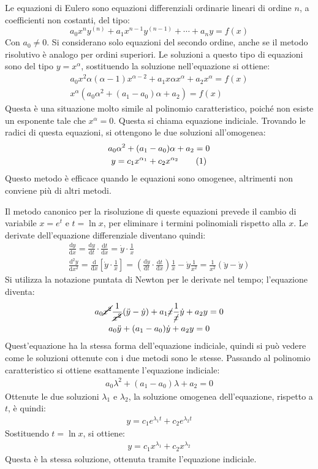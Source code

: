 \documentclass{article}
\newcommand{\df}{\mathrm{d}}
\newcommand{\diff}[2]{\displaystyle\frac{\df{#1}}{\df{#2}}}
\newcommand{\diffn}[3]{\displaystyle\frac{\df^{#3}{#1}}{\df{#2}^{#3}}}
\numberwithin{equation}{subsection}
\newcommand{\tageq}{\tag{\stepcounter{equation}\theequation}}
\begin{document}
Le equazioni di Eulero sono equazioni differenziali ordinarie lineari di ordine $n$, a coefficienti non costanti, del tipo:
\begin{equation}
    a_0x^ny^{(n)}+a_1x^{n-1}y^{(n-1)}+\cdots+a_ny=f(x)
\end{equation}
Con $a_0\neq0$. Si considerano solo equazioni del secondo ordine, anche se il metodo risolutivo è analogo per ordini superiori. Le soluzioni a questo tipo di equazioni sono del tipo $y=x^\alpha$, sostituendo la soluzione nell'equazione si ottiene:
\begin{gather*}
    a_0x^2\alpha(\alpha-1)x^{\alpha-2}+a_1x\alpha x^{\alpha}+a_2x^{\alpha}=f(x)\\
    x^\alpha(a_0\alpha^2+(a_1-a_0)\alpha+a_2)=f(x)
\end{gather*}
Questa è una situazione molto simile al polinomio caratteristico, poiché non esiste un esponente tale che $x^\alpha=0$. Questa si chiama equazione indiciale. Trovando le radici di questa equazioni, si ottengono le due soluzioni all'omogenea:
\begin{gather*}
    a_0\alpha^2+(a_1-a_0)\alpha+a_2=0\\
    y=c_1x^{\alpha_1}+c_2x^{\alpha_2}\tageq
\end{gather*}
Questo metodo è efficace quando le equazioni sono omogenee, altrimenti non conviene più di altri metodi. 


Il metodo canonico per la risoluzione di queste equazioni prevede il cambio di variabile $x=e^t$ e $t=\ln x$, per eliminare i termini polinomiali rispetto alla $x$. Le derivate dell'equazione differenziale diventano quindi:
\begin{gather*}
    \diff{y}{x}=\diff{y}{t}\cdot\diff{t}{x}=\dot y\cdot\frac{1}{x}\\
    \diffn{y}{x}{2}=\frac{\df}{\df x}\left[\dot y\cdot\frac{1}{x}\right]=\left(\diff{\dot y}{t}\cdot\diff{t}{x}\right)\frac{1}{x}-\dot y\frac{1}{x^2}=\frac{1}{x^2}(\ddot y-\dot y)
\end{gather*}
Si utilizza la notazione puntata di Newton per le derivate nel tempo; l'equazione diventa:
\begin{gather*}
    a_0\cancel{x^2}\frac{1}{\cancel{x^2}}(\ddot y-\dot y)+a_1\cancel{x}\frac{1}{\cancel{x}}\dot y+a_2y=0\\
    a_0\ddot y+(a_1-a_0)\dot y+a_2y=0
\end{gather*}
Quest'equazione ha la stessa forma dell'equazione indiciale, quindi si può vedere come le soluzioni ottenute con i due metodi sono le stesse. Passando al polinomio caratteristico si ottiene esattamente l'equazione indiciale:
\begin{gather*}
    a_0\lambda^2+(a_1-a_0)\lambda+a_2=0
\end{gather*}
Ottenute le due soluzioni $\lambda_1$ e $\lambda_2$, la soluzione omogenea dell'equazione, rispetto a $t$, è quindi:
\begin{gather*}
    y=c_1e^{\lambda_1t}+c_2e^{\lambda_2t}
\end{gather*}
Sostituendo $t=\ln x$, si ottiene:
\begin{gather}
    y=c_1x^{\lambda_1}+c_2x^{\lambda_2}
\end{gather}
Questa è la stessa soluzione, ottenuta tramite l'equazione indiciale. 
\end{document}
